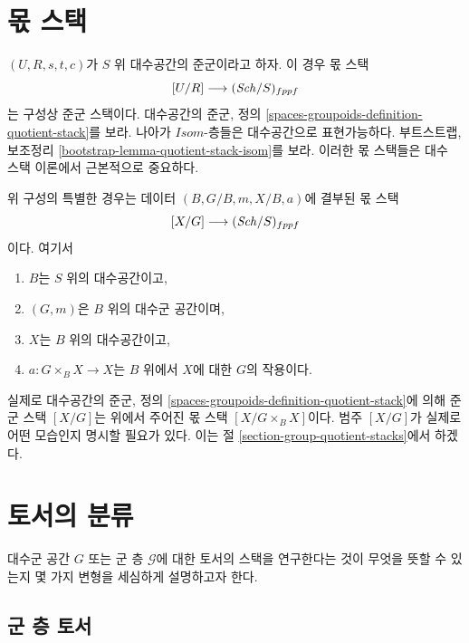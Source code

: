 \section{몫 스택}
\label{section-quotient-stacks}

\noindent
$(U, R, s, t, c)$가 $S$ 위 대수공간의 준군이라고 하자. 이 경우 몫 스택
$$
[U/R] \longrightarrow (\mathit{Sch}/S)_{fppf}
$$
는 구성상 준군 스택이다. 대수공간의 준군, 정의
\ref{spaces-groupoids-definition-quotient-stack}를 보라.
나아가 $\mathit{Isom}$-층들은 대수공간으로 표현가능하다. 부트스트랩,
보조정리 \ref{bootstrap-lemma-quotient-stack-isom}를 보라.
이러한 몫 스택들은 대수 스택 이론에서 근본적으로 중요하다.

\medskip\noindent
위 구성의 특별한 경우는 데이터 $(B, G/B, m, X/B, a)$에 결부된 몫 스택
$$
[X/G] \longrightarrow (\mathit{Sch}/S)_{fppf}
$$
이다. 여기서
\begin{enumerate}
\item $B$는 $S$ 위의 대수공간이고,
\item $(G, m)$은 $B$ 위의 대수군 공간이며,
\item $X$는 $B$ 위의 대수공간이고,
\item $a : G \times_B X \to X$는 $B$ 위에서 $X$에 대한 $G$의 작용이다.
\end{enumerate}
실제로 대수공간의 준군, 정의
\ref{spaces-groupoids-definition-quotient-stack}에 의해 준군 스택
$[X/G]$는 위에서 주어진 몫 스택 $[X/G \times_B X]$이다. 범주
$[X/G]$가 실제로 어떤 모습인지 명시할 필요가 있다. 이는 절
\ref{section-group-quotient-stacks}에서 하겠다.



\section{토서의 분류}
\label{section-torsors}

\noindent
대수군 공간 $G$ 또는 군 층 $\mathcal{G}$에 대한 토서의 스택을 연구한다는
것이 무엇을 뜻할 수 있는지 몇 가지 변형을 세심하게 설명하고자 한다.



\subsection{군 층 토서}
\label{subsection-torsors-sheaf}

